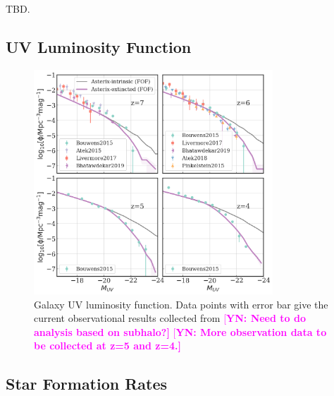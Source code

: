 \documentclass[fleqn,usenatbib]{mnras}
\newcommand{\yueying}[1]{\textcolor{magenta}{[\bf YN: #1]}}
\begin{document}
TBD.

\subsection{UV Luminosity Function}

\begin{figure}
\centering
  \includegraphics[width=0.8\textwidth]{plots/UVLF-z7-z4.png}
  \caption{Galaxy UV luminosity function. Data points with error bar give the current observational results collected from \citet{Bouwens2015,Livermore2017,Atek2015,Atek2018,Finkelstein2015,Bhatawdekar2019}
  \yueying{Need to do analysis based on subhalo?} \yueying{More observation data to be collected at z=5 and z=4.}}
  \label{fig:UVLF}
\end{figure}


\subsection{Star Formation Rates}
\end{document}
